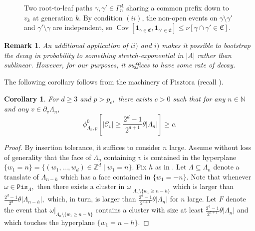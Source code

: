 \documentclass[article,11pt,reqno]{amsart}
\newtheorem{remark}[theorem]{Remark}
\newtheorem{corollary}[theorem]{Corollary}
\begin{document}
\begin{appendix}
\begin{figure}[ht]
\caption{Two root-to-leaf paths $\gamma,\gamma'\in \Gamma_n^A$ sharing a common prefix down to $v_k$ at generation $k$. By condition $(ii)$, the non-open events on $\gamma \setminus \gamma'$ and $\gamma'\setminus \gamma$ are independent, so $\operatorname{Cov}[\mathbf{1}_{\gamma\in\mathfrak{C}},\mathbf{1}_{\gamma'\in\mathfrak{C}}]\leq \nu[\gamma\cap\gamma'\in\mathfrak{C}]$.} %
\label{fig:tree_paths}
\end{figure}

\begin{remark} An additional application of $ii)$ and $i)$ makes it possible to bootstrap the decay in probability to something stretch-exponential in $|A|$ rather than sublinear. However, for our purposes, it suffices to have some rate of decay.
\end{remark}

The following corollary follows from the machinery of Pisztora (recall ).   



\begin{corollary} \label{Touch_Cluster}
For $d\geq 3$ and $p>p_c,$ there exists $c>0$ such that for any $n\in \mathbb{N}$ and any $v\in \partial_v \Lambda_n,$ 
$$
\phi^0_{\Lambda_n,p}[|\mathcal{C}_v| \geq \frac{2^d-1}{2^{d+1}}\theta|\Lambda_n|]\geq c.
$$
\end{corollary}
\begin{proof}
By insertion tolerance, it suffices to consider $n$ large.
Assume without loss of generality that the face of $\Lambda_n$ containing $v$ is contained in the hyperplane $\{w_1=n\}=\{(w_1,...,w_d)\in \mathbb{Z}^d\mid w_1=n\}$. Fix $h$ as in . Let $\Lambda\subseteq \Lambda_n$ denote a translate of $\Lambda_{n-h}$ which has a face contained in $\{w_1=-n\}$. Note that whenever $\omega\in \mathtt{Pis}_{\Lambda},$ then there exists a cluster in $\omega|_{\Lambda_n\setminus\{w_1\geq n-h\}}$ which is larger than $\frac{2^{d}-1}{2^d}\theta |\Lambda_{n-h}|,$
which, in turn, is larger than $\frac{2^d-1}{2^{d+1}}\theta|\Lambda_n|$ for $n$ large. Let $F$ denote the event that $\omega|_{\Lambda_n\setminus \{w_1\geq n-h\}}$ contains a cluster with size at least $\frac{2^d-1}{2^{d+1}}\theta|\Lambda_n|$ and which touches the hyperplane $\{w_1=n-h\}.$


\end{proof}
\end{appendix}
\end{document}
